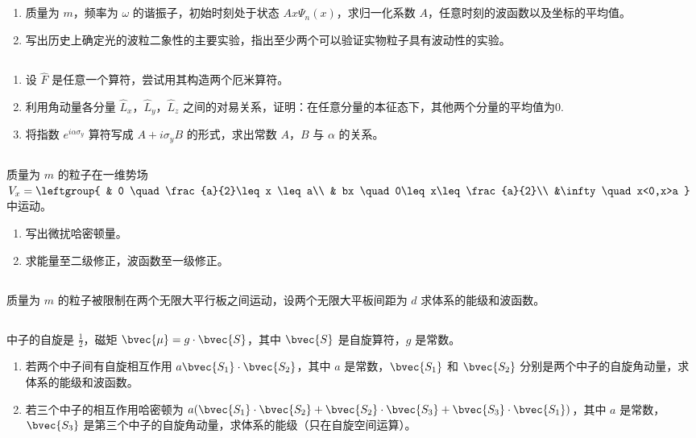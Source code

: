 
\subsection{ }
\begin{enumerate}
\item 质量为 $m$，频率为 $\omega$ 的谐振子，初始时刻处于状态 $Ax\varPsi_{n}(x)$，求归一化系数 $A$，任意时刻的波函数以及坐标的平均值。
\item 写出历史上确定光的波粒二象性的主要实验，指出至少两个可以验证实物粒子具有波动性的实验。
\end{enumerate}
\subsection{ }
\begin{enumerate}
\item 设 $\hat{F}$ 是任意一个算符，尝试用其构造两个厄米算符。
\item 利用角动量各分量 $\hat{L}_{x}$，$\hat{L}_{y}$，$\hat{L}_{z}$ 之间的对易关系，证明：在任意分量的本征态下，其他两个分量的平均值为0.
\item 将指数 $e^{i\alpha \sigma_{y}}$ 算符写成 $A+i\sigma_{y}B$ 的形式，求出常数 $A$，$B$ 与 $\alpha$ 的关系。
\end{enumerate}
\subsection{ }
质量为 $m$ 的粒子在一维势场 $V_{x}=\leftgroup{
    & 0 \quad \frac{a}{2}\leq x \leq a\\
    & bx \quad 0\leq x\leq\frac{a}{2}\\
    &\infty \quad x<0,x>a
    }$ 中运动。
\begin{enumerate}
\item 写出微扰哈密顿量。
\item 求能量至二级修正，波函数至一级修正。
\end{enumerate}
\subsection{ }
质量为 $m$ 的粒子被限制在两个无限大平行板之间运动，设两个无限大平板间距为 $d$ 求体系的能级和波函数。
\subsection{ }
中子的自旋是 $\frac{1}{2}$，磁矩 $\bvec{\mu}=g\cdot\bvec{S}$，其中 $\bvec{S}$ 是自旋算符，$g$ 是常数。
\begin{enumerate}
\item 若两个中子间有自旋相互作用 $a\bvec{S_1}\cdot\bvec{S_2}$，其中 $a$ 是常数，$\bvec{S_1}$ 和 $\bvec{S_2}$ 分别是两个中子的自旋角动量，求体系的能级和波函数。
\item 若三个中子的相互作用哈密顿为 $a(\bvec{S_{1}}\cdot\bvec{S_{2}}+\bvec{S_{2}}\cdot\bvec{S_{3}}+\bvec{S_{3}}\cdot\bvec{S_{1}})$，其中 $a$ 是常数，$\bvec{S_{3}}$ 是第三个中子的自旋角动量，求体系的能级（只在自旋空间运算）。
\end{enumerate}